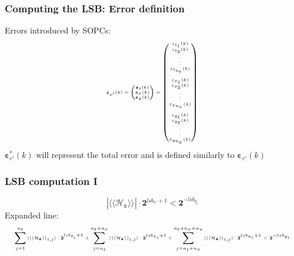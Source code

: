 \addtocounter{framenumber}{-1}
\begin{frame}
	\frametitle{Computing the LSB: Error definition}
	Errors introduced by SOPCs:
	\begin{equation}
		\tiny
		\boldsymbol{\varepsilon}_{v'}(k) =
		\begin{pmatrix}
			\boldsymbol{\varepsilon}_t(k) \\
			\boldsymbol{\varepsilon}_x(k) \\
			\boldsymbol{\varepsilon}_y(k) \\
		\end{pmatrix}
		=
		\begin{pmatrix}
			{\varepsilon}_{t_1}(k) \\
			{\varepsilon}_{t_2}(k) \\
			\vdots \\
			{\varepsilon}_{t_{n_t}}(k) \\
			\hspace{5pt} \\
			{\varepsilon}_{x_1}(k) \\
			{\varepsilon}_{x_2}(k) \\
			\vdots \\
			{\varepsilon}_{x_{n_x}}(k) \\
			\hspace{5pt} \\
			{\varepsilon}_{y_1}(k) \\
			{\varepsilon}_{y_2}(k) \\
			\vdots \\
			{\varepsilon}_{y_{n_y}}(k) \\
		\end{pmatrix}
	\end{equation}
	\footnotesize
	$\boldsymbol{\varepsilon}_{v'}^*(k)$ will represent the total error and is defined similarly to $\boldsymbol{\varepsilon}_{v'}(k)$
\end{frame}

\addtocounter{framenumber}{-1}
\begin{frame}
	\frametitle{LSB computation I}
		\begin{equation} \label{constraint}
			| \langle\langle \mathcal{H}_{\boldsymbol{\varepsilon}} \rangle\rangle_{} | \cdot \boldsymbol{2}^{lsb_{v'}+1} < \boldsymbol{2}^{-lsb_{y_i}}
		\end{equation}
		Expanded line:
		\begin{equation} \label{constraint}
		\tiny
			\sum_{j=1}^{n_t}| \langle\langle \mathcal{H}_{\boldsymbol{\varepsilon}} \rangle\rangle_{i,j} | \cdot \boldsymbol{2}^{lsb_{t_i}+1} +
			\sum_{j=n_t}^{n_t+n_x}| \langle\langle \mathcal{H}_{\boldsymbol{\varepsilon}} \rangle\rangle_{i,j} | \cdot \boldsymbol{2}^{lsb_{x_i}+1} +
			\sum_{j=n_t+n_x}^{n_t+n_x+n_u}| \langle\langle \mathcal{H}_{\boldsymbol{\varepsilon}} \rangle\rangle_{i,j} | \cdot \boldsymbol{2}^{lsb_{u_i}+1}
			< \boldsymbol{2}^{-lsb_{y_i}}
		\end{equation}
\end{frame}

